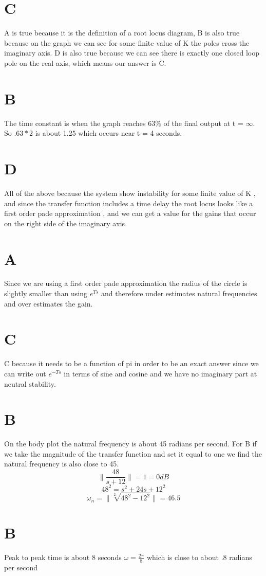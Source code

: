 \documentclass[11pt,english]{article}
\begin{document}
\section{C} 
A is true because it is the definition of a root locus diagram, B is also true because on the graph we can see for some finite value of K the poles cross the imaginary axis. D is also true because we can see there is exactly one closed loop pole on the real axis, which means our answer is C. 
\section{B} 
The time constant is when the graph reaches $63\%$ of the final output at t = $\infty$. So $.63 *2 $ is about 1.25 which occurs near t = 4 seconds. 
\section{D}
All of the above because the system show instability for some finite value of K , and since the transfer function includes a time delay the root locus looks like a first order pade approximation , and we can get a value for the gains that occur on the right side of the imaginary axis. 
\section{A}
Since we are using a first order pade approximation the radius of the circle is slightly smaller than using $e^{Ts}$ and therefore under estimates natural frequencies and over estimates the gain. 
\section{C}
C because it needs to be a function of pi in order to be an exact answer since we can write out $e^{-Ts}$ in terms of sine and cosine and we have no  imaginary part at neutral stability. 
\section{B}
On the body plot the natural frequency is about 45 radians per second. 
For B if we take the magnitude of the transfer function and set it equal to one we find the natural frequency is also close to 45. 
$$ \| \frac{48}{s + 12} \|  = 1 = 0 dB$$ 
$$ 48^2 = s^2 + 24s + 12^2 $$ 
$$\omega_n  = \|\sqrt[2]{48^2 - 12^2} \| =46.5$$

\section{B}
Peak to peak time is about 8 seconds 
$ \omega =\frac{2\pi}{8}  $ which is close to about .8 radians per second 
\end{document}
